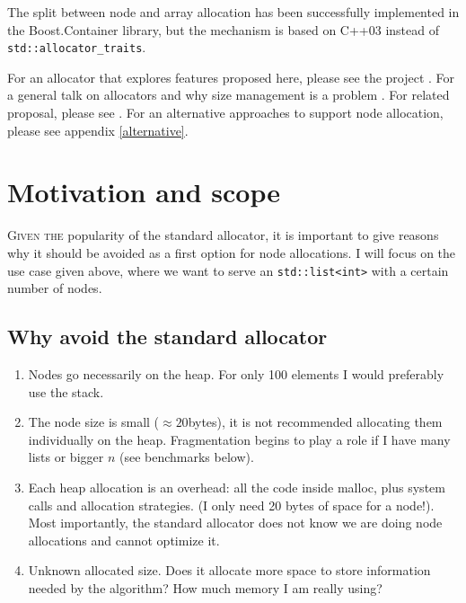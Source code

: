 \documentclass[11pt]{article}
\begin{document}
The split between node and array allocation has been successfully implemented
in the Boost.Container library, but the mechanism is based on C++03 instead of
\texttt{std::allocator\_traits}.

For an allocator that explores features proposed here, please see the
project \cite{rtcpp}. For a general talk on allocators and why size management
is a problem \cite{alexandrescu}. For related proposal, please see
\cite{prop1}.  For an alternative approaches to support node allocation, please
see appendix \ref{alternative}.

\section{Motivation and scope}

\textsc{Given the} popularity of the standard allocator, it is important to give reasons
why it should be avoided as a first option for node allocations. I will focus
on the use case given above, where we want to serve an
\texttt{std::list<int>} with a certain number of nodes.

\subsection{Why avoid the standard allocator}

\begin{enumerate}

\item Nodes go necessarily on the heap. For only 100 elements I would preferably
use the stack.

\item The node size is small ($\approx 20$bytes), it is not recommended
allocating them individually on the heap. Fragmentation begins to play a role
if I have many lists or bigger $n$ (see benchmarks below).

\item  Each heap allocation is an overhead: all the code inside malloc, plus
system calls and allocation strategies. (I only need 20 bytes of space for a
node!). Most importantly, the standard allocator does not
know we are doing node allocations and cannot optimize it.

\item Unknown allocated size. Does it allocate more space to store information
needed by the algorithm? How much memory I am really using?

\end{enumerate}
\end{document}
